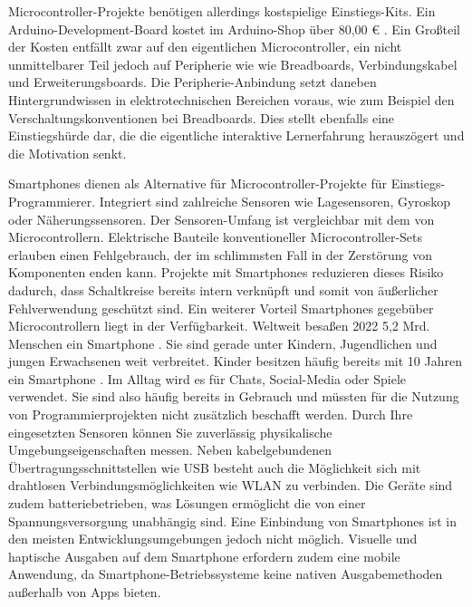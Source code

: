 \documentclass[11pt,a4paper]{report}
\begin{document}
Microcontroller-Projekte benötigen allerdings kostspielige Einstiegs-Kits.
Ein Arduino-Development-Board kostet im Arduino-Shop über 80,00 € \cite{arduino_kit}.
Ein Großteil der Kosten entfällt zwar auf den eigentlichen Microcontroller, ein nicht unmittelbarer Teil jedoch auf Peripherie wie wie Breadboards, Verbindungskabel und Erweiterungsboards.
Die Peripherie-Anbindung setzt daneben Hintergrundwissen in elektrotechnischen Bereichen voraus, wie zum Beispiel den Verschaltungskonventionen bei Breadboards.
Dies stellt ebenfalls eine Einstiegshürde dar, die die eigentliche interaktive Lernerfahrung herauszögert und die Motivation senkt.

Smartphones dienen als Alternative für Microcontroller-Projekte für Einstiegs-Programmierer.
Integriert sind zahlreiche Sensoren wie Lagesensoren, Gyroskop oder Näherungssensoren.
Der Sensoren-Umfang ist vergleichbar mit dem von Microcontrollern.
Elektrische Bauteile konventioneller Microcontroller-Sets erlauben einen Fehlgebrauch, der im schlimmsten Fall in der Zerstörung von Komponenten enden kann.
Projekte mit Smartphones reduzieren dieses Risiko dadurch, dass Schaltkreise bereits intern verknüpft und somit von äußerlicher Fehlverwendung geschützt sind.
Ein weiterer Vorteil Smartphones gegebüber Microcontrollern liegt in der Verfügbarkeit.
Weltweit besaßen 2022 5,2 Mrd. Menschen ein Smartphone \cite{smartphone_users}.
Sie sind gerade unter Kindern, Jugendlichen und jungen Erwachsenen weit verbreitet.
Kinder besitzen häufig bereits mit 10 Jahren ein Smartphone \cite{bitkom_smartphones}.
Im Alltag wird es für Chats, Social-Media oder Spiele verwendet.
Sie sind also häufig bereits in Gebrauch und müssten für die Nutzung von Programmierprojekten nicht zusätzlich beschafft werden.
Durch Ihre eingesetzten Sensoren können Sie zuverlässig physikalische Umgebungseigenschaften messen.
Neben kabelgebundenen Übertragungsschnittstellen wie USB besteht auch die Möglichkeit sich mit drahtlosen Verbindungsmöglichkeiten wie WLAN zu verbinden.
Die Geräte sind zudem batteriebetrieben, was Lösungen ermöglicht die von einer Spannungsversorgung unabhängig sind.
Eine Einbindung von Smartphones ist in den meisten Entwicklungsumgebungen jedoch nicht möglich.
Visuelle und haptische Ausgaben auf dem Smartphone erfordern zudem eine mobile Anwendung, da Smartphone-Betriebssysteme keine nativen Ausgabemethoden außerhalb von Apps bieten.
\end{document}
